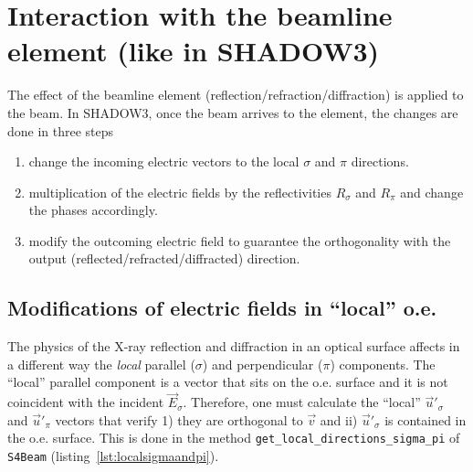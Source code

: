 \documentclass{iucr}
\begin{document}
\appendix

\section{Interaction with the beamline element (like in SHADOW3)}
\label{sec:S3}

The effect of the beamline element (reflection/refraction/diffraction) is applied to the beam. In SHADOW3, once the beam arrives to the element, the changes are done in three steps 
\begin{enumerate}
    \item change the incoming electric vectors to the local $\sigma$ and $\pi$ directions.
    \item multiplication of the electric fields by the reflectivities $R_\sigma$ and $R_\pi$ and change the phases accordingly.
    \item modify the outcoming electric field to guarantee the orthogonality with the output (reflected/refracted/diffracted) direction.
\end{enumerate}

\subsection{Modifications of electric fields in ``local'' o.e.}
\label{sec:localoe}


The physics of the X-ray reflection and diffraction in an optical surface affects in a different way 
the {\it local} parallel ($\sigma$) and perpendicular ($\pi$) components. The ``local'' parallel component
is a vector that sits on the o.e. surface and it is not coincident with the incident $\vec{E}_\sigma$.
Therefore, one must calculate the ``local'' $\vec{u}'_\sigma$ and $\vec{u}'_\pi$ vectors that verify
1) they are orthogonal to $\vec{v}$ and ii) $\vec{u}'_\sigma$ is contained in the o.e. surface. 
This is done in the method {\tt get\_local\_directions\_sigma\_pi} of {\tt S4Beam} (listing~\ref{lst:localsigmaandpi}).
\end{document}
